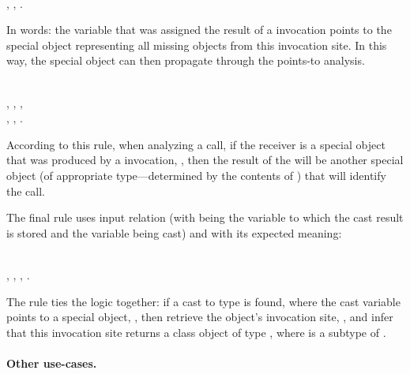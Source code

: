 \begin{rules}
  \\
\tab {}, , .\\
\end{rules}

\noindent In words: the variable that was assigned the result of a 
invocation points to the special object representing all missing objects from
this invocation site. In this way, the special object can then propagate through
the points-to analysis.

\begin{rules}
  \\
\tab {}, , , \\
\tab {}, , .
\end{rules}

\noindent According to this rule, when analyzing a 
call, if the receiver is a special object that was produced by a
 invocation, , then the result of the
 will be another special object (of appropriate
type---determined by the contents of ) that
will identify the  call.

The final rule uses input relation  (with
 being the variable to which the cast result is stored and
 the variable being cast) and
 with its expected meaning:

\begin{rules}
  \\
\tab {}, , , .\\
\end{rules}

\noindent The rule ties the logic together: if a cast to type 
is found, where the cast variable points to a special object,
, then retrieve the object's  invocation site,
, and infer that this invocation site returns a class object
of type , where  is a subtype of .


\paragraph{Other use-cases.}

